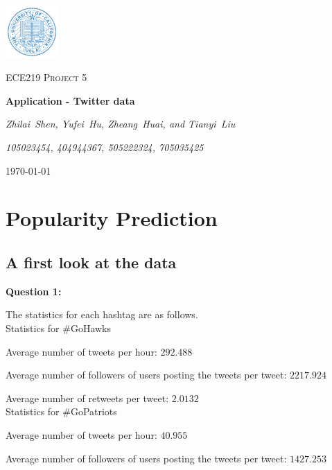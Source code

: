 \documentclass{article}
\begin{document}
\begin{titlepage}
	\centering
	\includegraphics[width=0.15\textwidth]{UCLA.png}\par\vspace{1cm}
	\vspace{1cm}
	{\scshape\Large ECE219 Project 5 \par}
	\vspace{1.5cm}
	{\huge\bfseries Application - Twitter data\par}
	\vspace{2cm}
	{\Large\itshape Zhilai~Shen, Yufei~Hu, Zheang~Huai, and Tianyi~Liu\par}
	{\Large\itshape 105023454, 404944367, 505222324, 705035425\par}
	\vfill

	\vfill

	{\large \today\par}
\end{titlepage}

\tableofcontents

\newpage

\section{Popularity Prediction}
\subsection{A first look at the data}
\textbf{Question 1:}

The statistics for each hashtag are as follows.\\

Statistics for \#GoHawks

Average number of tweets per hour: $292.488$

Average number of followers of users posting the tweets per tweet: $2217.924$

Average number of retweets per tweet: $2.0132$\\

Statistics for \#GoPatriots

Average number of tweets per hour: $40.955$

Average number of followers of users posting the tweets per tweet: $1427.253$
\end{document}
